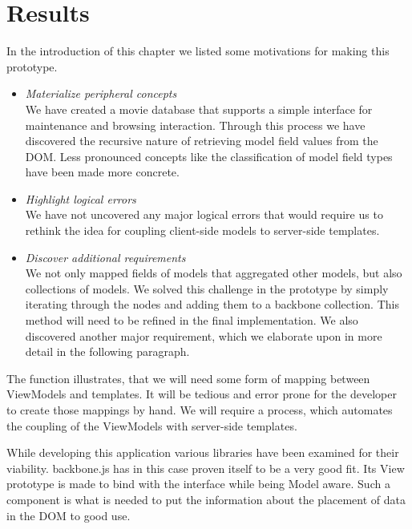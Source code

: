 \documentclass[thesis.tex]{subfiles}
\begin{document}
\section{Results}
\label{sec:first-results}
In the introduction of this chapter we listed some motivations for making
this prototype.

\begin{itemize}
	\item \emph{Materialize peripheral concepts}\\
	We have created a movie database that supports a simple interface
	for maintenance and browsing interaction.
	Through this process we have discovered the recursive nature of retrieving
	model field values from the DOM.
	Less pronounced concepts like the classification of model field types have 
	been made more concrete.
	\item \emph{Highlight logical errors}\\
	We have not uncovered any major logical errors that would require us to
	rethink the idea for coupling client-side models to server-side templates.
	\item \emph{Discover additional requirements}\\
	We not only mapped fields of models that aggregated other models,
	but also collections of models. We solved this challenge in the prototype
	by simply iterating through the nodes and adding them to
	a backbone collection. This method will need to be refined in the final
	implementation.
	We also discovered another major requirement, which we elaborate upon in more
	detail in the following paragraph.
\end{itemize}

The function  illustrates, that we will need some form
of mapping between ViewModels and templates.
It will be tedious and error prone for the developer to create those mappings
by hand. We will require a process, which automates the coupling of the
ViewModels with server-side templates.

While developing this application various libraries have been examined for their
viability. backbone.js has in this case proven itself to be a very good fit.
Its View prototype is made to bind with the interface while being Model aware.
Such a component is what is needed to put the information about
the placement of data in the DOM to good use.
\end{document}
